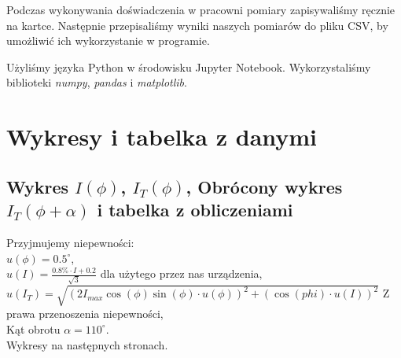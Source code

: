 \documentclass[12pt]{article}
\begin{document}
Podczas wykonywania doświadczenia w pracowni pomiary zapisywaliśmy ręcznie na
kartce. Następnie przepisaliśmy wyniki naszych pomiarów do pliku CSV, by
umożliwić ich wykorzystanie w programie.

Użyliśmy języka Python w środowisku Jupyter Notebook. Wykorzystaliśmy biblioteki
\textit{numpy}, \textit{pandas} i \textit{matplotlib}.
\section{Wykresy i tabelka z danymi}

\subsection*{Wykres $I(\phi)$, $I_T(\phi)$, Obrócony wykres
    $I_T(\phi + \alpha)$ i tabelka z obliczeniami}
Przyjmujemy niepewności: \\
\indent $u(\phi) = 0.5 ^{\circ}$, \\
\indent $u(I) = \frac{0.8\% \cdot I + 0.2}{\sqrt{3}}$ dla użytego przez nas urządzenia, \\
\indent $u(I_T) = \sqrt{(2I_{max}\cos(\phi)\sin(\phi) \cdot u(\phi))^2 + (\cos(phi) \cdot u(I))^2}$
Z prawa przenoszenia niepewności, \\
\indent Kąt obrotu $\alpha = 110^{\circ}$. \\
Wykresy na następnych stronach.



\end{document}
